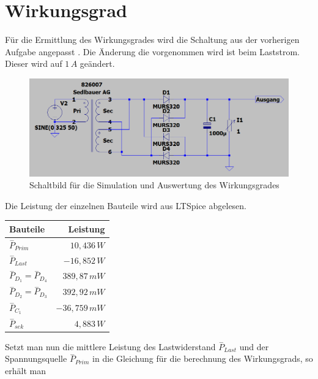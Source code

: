     \newpage
    \section{Wirkungsgrad}
        Für die Ermittlung des Wirkungsgrades wird die Schaltung aus der vorherigen Aufgabe angepasst .
        Die Änderung die vorgenommen wird ist beim Laststrom. Dieser wird auf $1\, A$ geändert.\par
        \begin{figure}[ht!]
            \centering
            \includegraphics[width=.9\textwidth]{Bilder/wirkungsgrad.png}
            \caption{Schaltbild für die Simulation und Auswertung des Wirkungsgrades}
            \label{fig:schaltbild_wirkungsgrad}
        \end{figure}

        Die Leistung der einzelnen Bauteile wird aus LTSpice abgelesen. 
        \begin{center}
            \begin{tabular}{l r}
                \hline
                Bauteile & Leistung \\
                \hline
                $\overset{-}{P}_{Prim}$& $10,436\, W$ \\
                $\overset{-}{P}_{Last}$ & $-16,852\, W$ \\
                $\overset{-}{P}_{D_1}=\overset{-}{P}_{D_4}$ & $389,87\, mW$\\
                $\overset{-}{P}_{D_2}=\overset{-}{P}_{D_3}$ & $392,92\, mW$\\
                $\overset{-}{P}_{C_1}$ & $-36,759\, mW$\\
                $\overset{-}{P}_{sek}$ & $4,883\, W$\\
                \hline
            \end{tabular} 
        \end{center}

        Setzt man nun die mittlere Leistung des Lastwiderstand $\overset{-}{P}_{Last}$ und der Spannungsquelle $\overset{-}{P}_{Prim}$ in die Gleichung für die berechnung des Wirkungsgrads, so erhält man 

